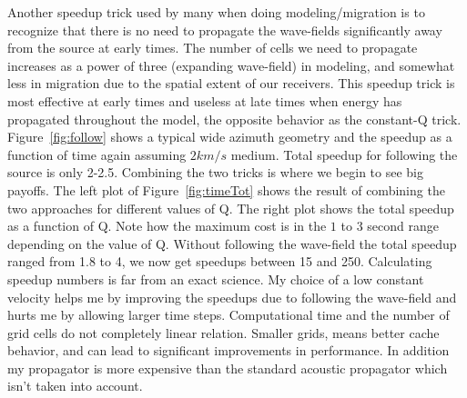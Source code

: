 \par
Another speedup trick used by many when doing modeling/migration is to recognize that there is no need to propagate the wave-fields significantly away from the source
at early times.  The number of cells we need to propagate increases as a  power of three (expanding wave-field)
in modeling, and somewhat less in migration due to the spatial extent of our receivers.
This speedup trick is most effective at early times and useless at late times when energy has propagated throughout the model, the  opposite
behavior as the constant-Q trick. Figure~\ref{fig:follow}  shows a typical wide azimuth geometry and
the speedup as a function of time again assuming $2 km/s$ medium. Total speedup for
following the source is only 2-2.5.   
Combining the two tricks is where we begin to see big payoffs.
The left plot of Figure~\ref{fig:timeTot} shows the result of combining the two approaches for different values of
Q.  The right plot shows the total speedup as a function of Q.  Note how the maximum cost is in the $1$ to $3$ second range
depending on the value of Q.  Without following the wave-field the total speedup ranged from  1.8 to 4, we now get speedups between 15 and 250.
 Calculating speedup numbers is far from an exact science. My choice of a low constant velocity helps me by improving the speedups due to following the wave-field and hurts me by allowing larger time steps.  Computational
time and the number of grid cells do not completely linear relation. Smaller grids, means better cache behavior, and can lead
to significant improvements in performance. In addition my propagator is more
expensive than the standard acoustic propagator which isn't taken into account.

